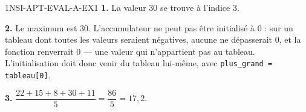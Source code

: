 \begin{corrige}{1NSI-APT-EVAL-A-EX1}
\textbf{1.} La valeur $30$ se trouve à l'indice $3$.

\textbf{2.} Le maximum est $30$. L'accumulateur ne peut pas être initialisé à $0$ : sur
un tableau dont toutes les valeurs seraient négatives, aucune ne dépasserait $0$, et la
fonction renverrait $0$ — une valeur qui n'appartient pas au tableau. L'initialisation doit
donc venir du tableau lui-même, avec \lstinline{plus_grand = tableau[0]}.

\textbf{3.} $\dfrac{22+15+8+30+11}{5}=\dfrac{86}{5}=17{,}2$.
\end{corrige}

